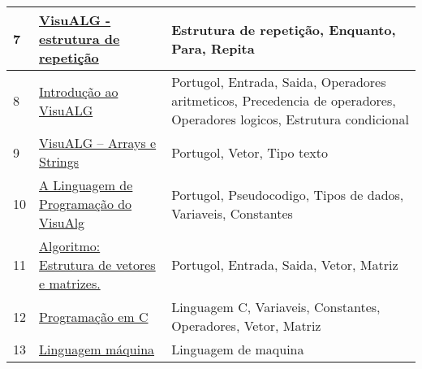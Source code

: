 \begin{longtable}{| p{} | p{} | p{} |}
7   & \href{http://download2.nust.na/pub4/sourceforge/v/vi/visualg30/IP\_03\_VisuALG\_Repeticao.pdf}{\color{blue} VisuALG - estrutura de repetição                                                    } & Estrutura de repetição, Enquanto, Para, Repita                                                                                                    \\ \hline
8   & \href{http://download2.nust.na/pub4/sourceforge/v/vi/visualg30/IP\_02\_VisuALG\_Basico.pdf}{\color{blue} Introdução ao VisuALG                                                               } & Portugol, Entrada, Saida, Operadores aritmeticos, Precedencia de operadores, Operadores logicos, Estrutura condicional                            \\ \hline
9   & \href{http://download2.nust.na/pub4/sourceforge/v/vi/visualg30/IP\_04\_VisuALG\_Arrays.pdf}{\color{blue} VisuALG – Arrays e Strings                                                          } & Portugol, Vetor, Tipo texto                                                                                                                       \\ \hline
10  & \href{http://eletrica.ufpr.br/~rogerio/visualg/Help/linguagem.htm}{\color{blue} A Linguagem de Programação do VisuAlg                                               } & Portugol, Pseudocodigo, Tipos de dados, Variaveis, Constantes                                                                                     \\ \hline
11  & \href{http://fabrica.ms.senac.br/2013/06/algoritmo-estrutura-de-vetores-e-matrizes/}{\color{blue} Algoritmo: Estrutura de vetores e matrizes.                                         } & Portugol, Entrada, Saida, Vetor, Matriz                                                                                                           \\ \hline
12  & \href{http://fig.if.usp.br/~esdobay/c/c.pdf}{\color{blue} Programação em C                                                                    } & Linguagem C, Variaveis, Constantes, Operadores, Vetor, Matriz                                                                                     \\ \hline
13  & \href{http://knoow.net/ciencinformtelec/informatica/linguagem-maquina/}{\color{blue} Linguagem máquina                                                                   } & Linguagem de maquina                                                                                                                              \\ \hline

\end{longtable}
